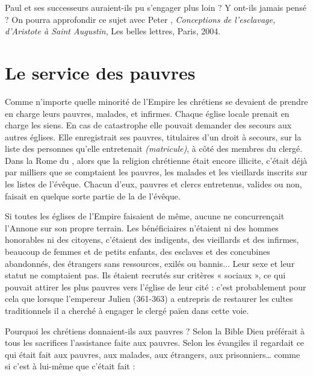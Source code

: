  Paul et ses successeurs auraient-ils pu s'engager plus loin ? Y ont-ils jamais pensé ?  On pourra approfondir ce sujet avec Peter , \emph{Conceptions de l'esclavage, d'Aristote à Saint Augustin}, Les belles lettres, Paris, 2004.



\section{Le service des pauvres}

 Comme n'importe quelle minorité de l'Empire les chrétiens se devaient de prendre en charge leurs pauvres, malades, et infirmes. Chaque église locale prenait en charge les siens. En cas de catastrophe elle pouvait demander des secours aux autres églises. Elle enregistrait ses pauvres, titulaires d'un droit à secours, sur la liste des personnes qu'elle entretenait \emph{(matricule)}, à côté des membres du clergé. Dans la Rome du , alors que la religion chrétienne était encore illicite, c'était déjà par milliers que se comptaient les pauvres, les malades et les vieillards inscrits sur les listes de l'évêque. Chacun d'eux, pauvres et clercs entretenus, valides ou non, faisait en quelque sorte partie de la  de l'évêque. 

 Si toutes les églises de l'Empire faisaient de même, aucune ne concurrençait l'Annone sur son propre terrain. Les bénéficiaires n'étaient ni des hommes honorables ni des citoyens, c'étaient des indigents, des vieillards et des infirmes, beaucoup de femmes et de petits enfants, des esclaves et des concubines abandonnés, des étrangers sans ressources, exilés ou bannis... Leur sexe et leur statut ne comptaient pas. Ils étaient recrutés sur critères « sociaux », ce qui pouvait attirer les plus pauvres vers l'église de leur cité : c'est probablement pour cela que lorsque l'empereur Julien (361-363) a entrepris de restaurer les cultes traditionnels il a cherché à engager le clergé païen dans cette voie.

 Pourquoi les chrétiens donnaient-ils aux pauvres ? Selon la Bible Dieu préférait à tous les sacrifices l'assistance faite aux pauvres. Selon les évangiles il regardait ce qui était fait aux pauvres, aux malades, aux étrangers, aux prisonniers… comme si c'est à lui-même que c'était fait :

